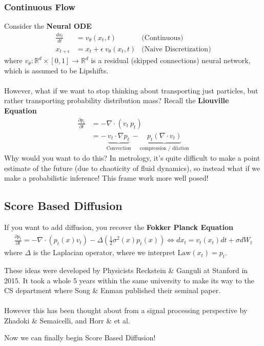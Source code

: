 \subsubsection{Continuous Flow}
Consider the \textbf{Neural ODE}
\begin{align}
	\frac{dx_t}{dt} & = v_\theta(x_t,t) & \text{(Continuous)}\\
	x_{t+\epsilon} & = x_t + \epsilon~ v_\theta(x_t, t) & \text{(Naive Discretization)}
\end{align}
where $v_\theta : \mathbb R^d \times [0,1] \to \mathbb R^d$ is a residual (skipped connections) neural network, which is assumed to be Lipshifts.\\
\\
However, what if we want to stop thinking about transporting just particles, but rather transporting probability distribution mass? Recall the \textbf{Liouville Equation}
\begin{align}
	\frac{\partial p_t}{\partial t} & = - \nabla \cdot (v_t ~p_t)\\
	& = - \underbrace{v_t \cdot \nabla p_t}_{\text{Convection}} - \underbrace{p_t (\nabla \cdot  v_t )}_{\text{compression / dilation}}
\end{align}
Why would you want to do this? In metrology, it's quite difficult to make a point estimate of the future (due to chaoticity of fluid dynamics), so instead what if we make a probabilistic inference! This frame work more well posed! 

\subsection{Score Based Diffusion}
If you want to add diffusion, you recover the \textbf{Fokker Planck Equation}
\begin{align}
	\frac{\partial p_t}{\partial t} = - \nabla \cdot (p_t(x) v_t) - \Delta \left(\frac{1}{2} \sigma^2(x) p_t(x) \right)\iff dx_t = v_t(x_t) dt + \sigma dW_t \label{eqn:FokkerPlanck}
\end{align}
where $\Delta$ is the Laplacian operator, where we interpret $\text{Law}(x_t) = p_t$. 

\begin{sidework}
	These ideas were developed by Physicists Reckstein \& Ganguli at Stanford in 2015. It took a whole 5 years within the same university to make its way to the CS department where Song \& Enman published their seminal paper. 
	\\
	\\
	However this has been thought about from a signal processing perspective by Zhadoki \& Semaicelli, and Horr \& et al.
\end{sidework}
Now we can finally begin Score Based Diffusion!
